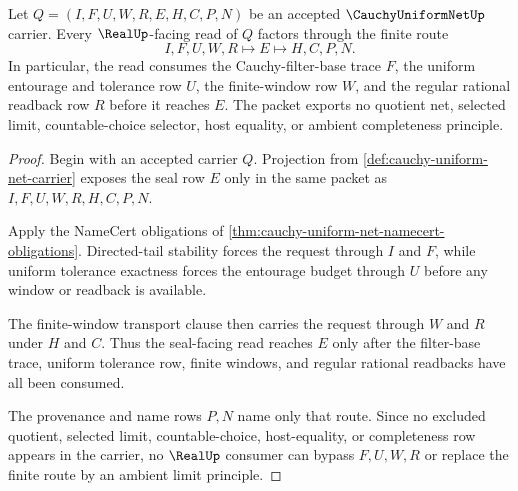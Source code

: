 
\begin{theorem}
\label{thm:cauchy-uniform-net-filter-real-route}
Let $Q=(I,F,U,W,R,E,H,C,P,N)$ be an accepted $\CauchyUniformNetUp$ carrier. Every $\RealUp$-facing read of $Q$ factors through the finite route
$$
I,F,U,W,R \longmapsto E \longmapsto H,C,P,N .
$$
In particular, the read consumes the Cauchy-filter-base trace $F$, the uniform entourage and tolerance row $U$, the finite-window row $W$, and the regular rational readback row $R$ before it reaches $E$. The packet exports no quotient net, selected limit, countable-choice selector, host equality, or ambient completeness principle.
\end{theorem}
\begin{proof}
Begin with an accepted carrier $Q$. Projection from \autoref{def:cauchy-uniform-net-carrier} exposes the seal row $E$ only in the same packet as $I,F,U,W,R,H,C,P,N$.

Apply the NameCert obligations of \autoref{thm:cauchy-uniform-net-namecert-obligations}. Directed-tail stability forces the request through $I$ and $F$, while uniform tolerance exactness forces the entourage budget through $U$ before any window or readback is available.

The finite-window transport clause then carries the request through $W$ and $R$ under $H$ and $C$. Thus the seal-facing read reaches $E$ only after the filter-base trace, uniform tolerance row, finite windows, and regular rational readbacks have all been consumed.

The provenance and name rows $P,N$ name only that route. Since no excluded quotient, selected limit, countable-choice, host-equality, or completeness row appears in the carrier, no $\RealUp$ consumer can bypass $F,U,W,R$ or replace the finite route by an ambient limit principle.
\end{proof}


